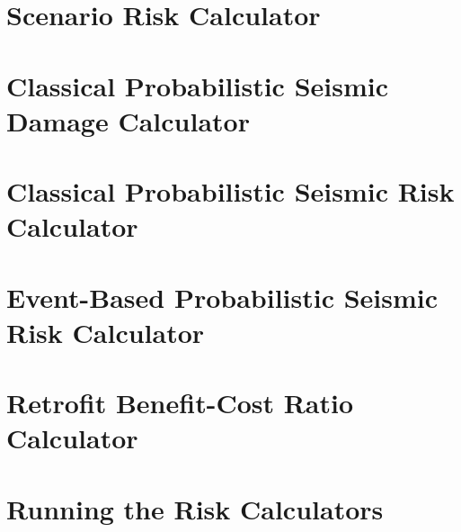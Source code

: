 \section{Scenario Risk Calculator}
\label{sec:config_scenario_risk}


\section{Classical Probabilistic Seismic Damage Calculator}
\label{sec:config_classical_damage}


\section{Classical Probabilistic Seismic Risk Calculator}
\label{sec:config_classical_risk}


\section{Event-Based Probabilistic Seismic Risk Calculator}
\label{sec:config_event_based_risk}


\section{Retrofit Benefit-Cost Ratio Calculator}
\label{sec:config_benefit_cost}


\section{Running the Risk Calculators}
\label{sec:running_risk}


\cleardoublepage